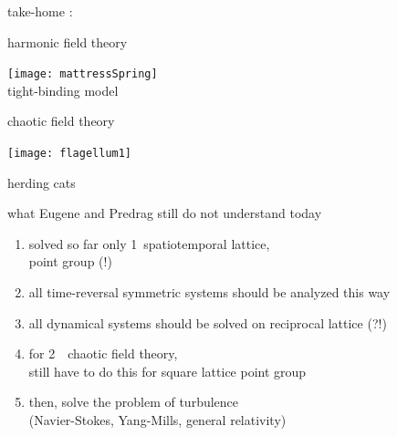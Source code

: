 \begin{frame}{take-home :   }
\begin{center}
            \begin{minipage}[c]{0.40\textwidth}\begin{center}
{\color{purple}harmonic} field theory
\bigskip

\texttt{[image: mattressSpring]}\\
{\color{blue}tight-binding} model
            \end{center}\end{minipage}
            \hspace{2ex}
            \begin{minipage}[c]{0.46\textwidth}\begin{center}
{\color{purple}chaotic} field theory\\
\bigskip
\bigskip
\bigskip

\texttt{[image: flagellum1]}\\
\bigskip

herding cats
            \end{center}\end{minipage}
\end{center}
\end{frame}%

\begin{frame} {what Eugene and Predrag still do not understand today}
  \begin{enumerate}
              \item
solved so far only 1\dmn\ {\color{orange}spatio}{temporal} lattice,
\\
point group  (!)
              \item
all time-reversal symmetric systems should be analyzed this way
              \item
all dynamical systems should be solved on reciprocal lattice (?!)
              \item
for 2\dmn\ \spt\ chaotic field theory,
\\
still have to do this for square lattice point group 
              \item
then, solve the problem of turbulence \\
(Navier-Stokes, Yang-Mills, general relativity)
   \end{enumerate}
\end{frame} %

%
%
%
%
%
%

